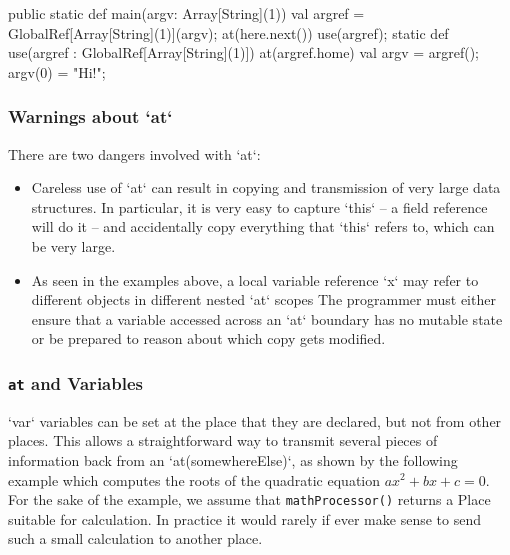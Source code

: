 \begin{xten}
  public static def main(argv: Array[String](1)) {
    val argref = GlobalRef[Array[String](1)](argv);
    at(here.next()) use(argref);
  }
  static def use(argref : GlobalRef[Array[String](1)]) {
    at(argref.home) {
      val argv = argref();
      argv(0) = "Hi!";
    }
  }
\end{xten}





\subsubsection{Warnings about \xcd`at`}
There are two dangers involved with \xcd`at`: 
\begin{itemize}
\item Careless use of \xcd`at` can result in copying and transmission
of very large data structures.  In particular, it is very easy to capture
\xcd`this` -- a field reference will do it -- and accidentally copy everything
that \xcd`this` refers to, which can be very large.

\item As seen in the examples above, a local variable reference
  \xcd`x` may refer to different objects in different nested \xcd`at`
  scopes The programmer must either ensure that a variable accessed
  across an \xcd`at` boundary has no mutable state or be prepared to
  reason about which copy gets modified. 
\end{itemize}

\subsubsection{{\tt at} and Variables}

\xcd`var` variables can be set at the place that they are declared, but not
from other places.  This allows a straightforward way to transmit several
pieces of information back from an \xcd`at(somewhereElse)`, as shown by the
following example which computes the roots of the quadratic equation 
{$ax^2 + bx + c = 0$}.  
For the sake of the example, we assume that 
{\tt mathProcessor()} returns a Place suitable for calculation.  In practice
it would rarely if ever make sense to send such a small calculation to another
place. 

